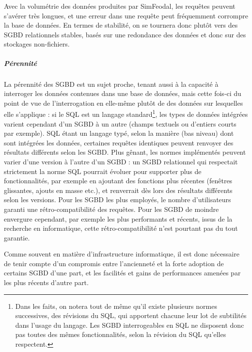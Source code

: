 		Avec la volumétrie des données produites par SimFeodal, les requêtes peuvent s'avérer très longues, et une erreur dans une requête peut fréquemment corrompre la base de données.
		En termes de stabilité, on se tournera donc plutôt vers des SGBD relationnels stables, basés sur une redondance des données et donc sur des stockages non-fichiers.
		
		\subparagraph{Pérennité}
		La pérennité des SGBD est un sujet proche, tenant aussi à la capacité à interroger les données contenues dans une base de données, mais cette fois-ci du point de vue de l'interrogation en elle-même plutôt de des données sur lesquelles elle s'applique : 
		si le SQL est un langage standard\footnote{
		Dans les faits, on notera tout de même qu'il existe plusieurs normes successives, des \og révisions\fg{} du SQL, qui apportent chacune leur lot de subtilités dans l'usage du langage. Les SGBD interrogeables en SQL ne disposent donc pas toutes des mêmes fonctionnalités, selon la révision du SQL qu'elles respectent.
		}, les types de données intégrées varient cependant d'un SGBD à un autre (champs textuels ou d'entiers \og courts\fg{} par exemple).
		SQL étant un langage typé, selon la manière (bas niveau) dont sont intégrées les données, certaines requêtes identiques peuvent renvoyer des résultats différents selon les SGBD.
		Plus gênant, les normes implémentés peuvent varier d'une version à l'autre d'un SGBD : un SGBD relationnel qui respectait strictement la norme SQL pourrait évoluer pour supporter plus de fonctionnalités, par exemple en ajoutant des fonctions plus récentes (fenêtres glissantes, ajouts en masse etc.), et renverrait dès lors des résultats différents selon les versions.
		Pour les SGBD les plus employés, le nombre d'utilisateurs garanti une rétro-compatibilité des requêtes.
		Pour les SGBD de moindre envergure cependant, par exemple les plus performants et récents, issus de la recherche en informatique, cette rétro-compatibilité n'est pourtant pas du tout garantie.
		
		Comme souvent en matière d'infrastructure informatique, il est donc nécessaire de tenir compte d'un compromis entre l'ancienneté et la forte adoption de certains SGBD d'une part, et les facilités et gains de performances amenées par les plus récents d'autre part.
		
